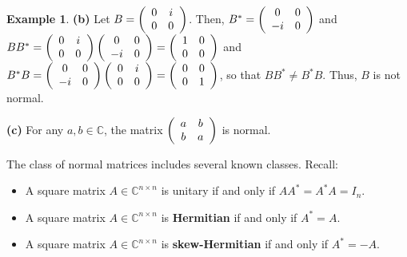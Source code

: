 \documentclass[numbers=enddot,12pt,final,onecolumn,notitlepage]{scrartcl}%
\numberwithin{exer}{subsection}
\theoremstyle{definition}
\newtheorem{exam}[theo]{Example}
\begin{document}
\begin{exam}
\textbf{(b)} Let $B=\left(
\begin{array}
[c]{cc}%
0 & i\\
0 & 0
\end{array}
\right)  $. Then, $B^{\ast}=\left(
\begin{array}
[c]{cc}%
0 & 0\\
-i & 0
\end{array}
\right)  $ and $BB^{\ast}=\left(
\begin{array}
[c]{cc}%
0 & i\\
0 & 0
\end{array}
\right)  \left(
\begin{array}
[c]{cc}%
0 & 0\\
-i & 0
\end{array}
\right)  =\allowbreak\left(
\begin{array}
[c]{cc}%
1 & 0\\
0 & 0
\end{array}
\right)  $ and $B^{\ast}B=\left(
\begin{array}
[c]{cc}%
0 & 0\\
-i & 0
\end{array}
\right)  \left(
\begin{array}
[c]{cc}%
0 & i\\
0 & 0
\end{array}
\right)  =\allowbreak\left(
\begin{array}
[c]{cc}%
0 & 0\\
0 & 1
\end{array}
\right)  $, so that $BB^{\ast}\neq B^{\ast}B$. Thus, $B$ is not normal.

\textbf{(c)} For any $a,b\in\mathbb{C}$, the matrix $\left(
\begin{array}
[c]{cc}%
a & b\\
b & a
\end{array}
\right)  $ is normal.
\end{exam}

The class of normal matrices includes several known classes. Recall:

\begin{itemize}
\item A square matrix $A\in\mathbb{C}^{n\times n}$ is unitary if and only if
$AA^{\ast}=A^{\ast}A=I_{n}$.

\item A square matrix $A\in\mathbb{C}^{n\times n}$ is \textbf{Hermitian} if
and only if $A^{\ast}=A$.

\item A square matrix $A\in\mathbb{C}^{n\times n}$ is \textbf{skew-Hermitian}
if and only if $A^{\ast}=-A$.
\end{itemize}
\end{document}
